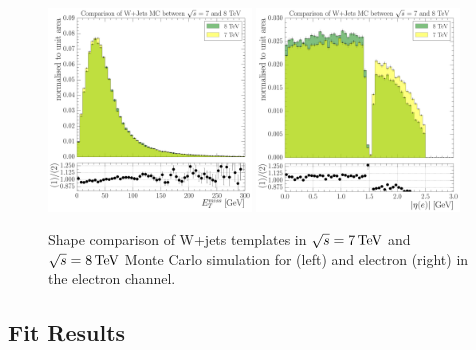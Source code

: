 \begin{figure}[hbtp]
    \centering
     \includegraphics[width=0.48\textwidth]{Chapters/04_Analysis/04b_XSections/images/WJets_comparison/TTbar_plus_X_analysis_EPlusJets_Refselection_MET_patType1CorrectedPFMet_MET_0orMoreBtag.pdf}\hfill
	 \includegraphics[width=0.48\textwidth]{Chapters/04_Analysis/04b_XSections/images/WJets_comparison/TTbar_plus_X_analysis_EPlusJets_Refselection_Electron_electron_AbsEta_0orMoreBtag.pdf}\\
	 \caption{Shape comparison of W+jets templates in $\sqrt{s}=7\,\text{Te\hspace{-.08em}V}$ and $\sqrt{s}=8\,\text{Te\hspace{-.08em}V}$ Monte Carlo
	 simulation for \met (left) and electron \abseta (right) in the electron channel.}
     \label{fig:wjets_7TeV_8TeV_comparison}
\end{figure}



\subsection{Fit Results}
\label{ss:fit_results}

